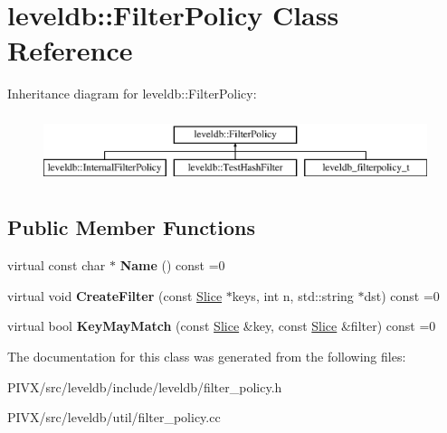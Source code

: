 \hypertarget{classleveldb_1_1_filter_policy}{}\section{leveldb\+:\+:Filter\+Policy Class Reference}
\label{classleveldb_1_1_filter_policy}
Inheritance diagram for leveldb\+:\+:Filter\+Policy\+:\begin{figure}[H]
\begin{center}
\leavevmode
\includegraphics[height=2.000000cm]{classleveldb_1_1_filter_policy}
\end{center}
\end{figure}
\subsection*{Public Member Functions}
\begin{DoxyCompactItemize}
\item 
\mbox{\label{classleveldb_1_1_filter_policy_afd5e951892a2e740f186c0658913ea1b}} 
virtual const char $\ast$ {\bfseries Name} () const =0
\item 
\mbox{\label{classleveldb_1_1_filter_policy_a355e9797e16dd16b93d19056781126b2}} 
virtual void {\bfseries Create\+Filter} (const \mbox{\hyperlink{classleveldb_1_1_slice}{Slice}} $\ast$keys, int n, std\+::string $\ast$dst) const =0
\item 
\mbox{\label{classleveldb_1_1_filter_policy_a6f8ba10ea25e0b4b8d0a6607c361c718}} 
virtual bool {\bfseries Key\+May\+Match} (const \mbox{\hyperlink{classleveldb_1_1_slice}{Slice}} \&key, const \mbox{\hyperlink{classleveldb_1_1_slice}{Slice}} \&filter) const =0
\end{DoxyCompactItemize}


The documentation for this class was generated from the following files\+:\begin{DoxyCompactItemize}
\item 
P\+I\+V\+X/src/leveldb/include/leveldb/filter\+\_\+policy.\+h\item 
P\+I\+V\+X/src/leveldb/util/filter\+\_\+policy.\+cc\end{DoxyCompactItemize}
